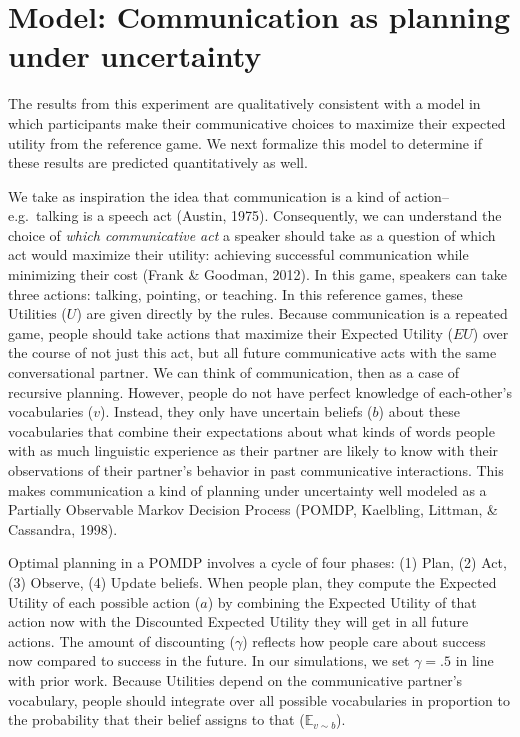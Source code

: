 \documentclass[10pt, letterpaper]{article}
\begin{document}
\hypertarget{model-communication-as-planning-under-uncertainty}{%
\section{Model: Communication as planning under
uncertainty}\label{model-communication-as-planning-under-uncertainty}}

The results from this experiment are qualitatively consistent with a
model in which participants make their communicative choices to maximize
their expected utility from the reference game. We next formalize this
model to determine if these results are predicted quantitatively as
well.

\newcommand{\E}[1]{\mathbb{E}\left[ #1 \right]}

We take as inspiration the idea that communication is a kind of
action--e.g.~talking is a speech act (Austin, 1975). Consequently, we
can understand the choice of \emph{which communicative act} a speaker
should take as a question of which act would maximize their utility:
achieving successful communication while minimizing their cost (Frank \&
Goodman, 2012). In this game, speakers can take three actions: talking,
pointing, or teaching. In this reference games, these Utilities (\(U\))
are given directly by the rules. Because communication is a repeated
game, people should take actions that maximize their Expected Utility
(\(EU\)) over the course of not just this act, but all future
communicative acts with the same conversational partner. We can think of
communication, then as a case of recursive planning. However, people do
not have perfect knowledge of each-other's vocabularies (\(v\)).
Instead, they only have uncertain beliefs (\(b\)) about these
vocabularies that combine their expectations about what kinds of words
people with as much linguistic experience as their partner are likely to
know with their observations of their partner's behavior in past
communicative interactions. This makes communication a kind of planning
under uncertainty well modeled as a Partially Observable Markov Decision
Process (POMDP, Kaelbling, Littman, \& Cassandra, 1998).

Optimal planning in a POMDP involves a cycle of four phases: (1) Plan,
(2) Act, (3) Observe, (4) Update beliefs. When people plan, they compute
the Expected Utility of each possible action (\(a\)) by combining the
Expected Utility of that action now with the Discounted Expected Utility
they will get in all future actions. The amount of discounting
(\(\gamma\)) reflects how people care about success now compared to
success in the future. In our simulations, we set \(\gamma=.5\) in line
with prior work. Because Utilities depend on the communicative partner's
vocabulary, people should integrate over all possible vocabularies in
proportion to the probability that their belief assigns to that
(\(\mathbb{E}_{v \sim b}\)).
\end{document}

